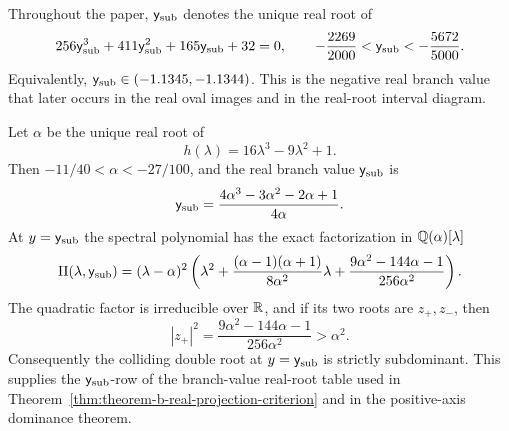 \begin{definition}\label{def:ysub}
Throughout the paper, \(\mathsf{y}_{\mathrm{sub}}\) denotes the unique real root of
\begin{equation}\label{eq:ysub-definition}
256\mathsf{y}_{\mathrm{sub}}^3+411\mathsf{y}_{\mathrm{sub}}^2+165\mathsf{y}_{\mathrm{sub}}+32=0,
\qquad
-\frac{2269}{2000}<\mathsf{y}_{\mathrm{sub}}<-\frac{5672}{5000}.
\end{equation}
Equivalently, \(\mathsf{y}_{\mathrm{sub}}\in(-1.1345,-1.1344)\).  This is the negative real branch value that later occurs in the real oval images and in the real-root interval diagram.
\end{definition}

\begin{lemma}\label{lem:ysub-exact-subdominance}
Let \(\alpha\) be the unique real root of
\[
h(\lambda)=16\lambda^3-9\lambda^2+1.
\]
Then \(-11/40<\alpha<-27/100\), and the real branch value \(\mathsf{y}_{\mathrm{sub}}\) is
\begin{equation}\label{eq:ysub-alpha-formula}
\mathsf{y}_{\mathrm{sub}}=\frac{4\alpha^3-3\alpha^2-2\alpha+1}{4\alpha}.
\end{equation}
At \(y=\mathsf{y}_{\mathrm{sub}}\) the spectral polynomial has the exact factorization in \(\mathbb{Q}(\alpha)[\lambda]\)
\begin{equation}\label{eq:ysub-factorization}
\Pi(\lambda,\mathsf{y}_{\mathrm{sub}})
=(\lambda-\alpha)^2
\left(
\lambda^2+\frac{(\alpha-1)(\alpha+1)}{8\alpha^2}\lambda
+\frac{9\alpha^2-144\alpha-1}{256\alpha^2}
\right).
\end{equation}
The quadratic factor is irreducible over \(\mathbb{R}\), and if its two roots are \(z_{+},z_{-}\), then
\begin{equation}\label{eq:ysub-modulus-gap}
|z_{+}|^2
=\frac{9\alpha^2-144\alpha-1}{256\alpha^2}
>\alpha^2.
\end{equation}
Consequently the colliding double root at \(y=\mathsf{y}_{\mathrm{sub}}\) is strictly subdominant.  This supplies the \(\mathsf{y}_{\mathrm{sub}}\)-row of the branch-value real-root table used in Theorem~\ref{thm:theorem-b-real-projection-criterion} and in the positive-axis dominance theorem.
\end{lemma}


